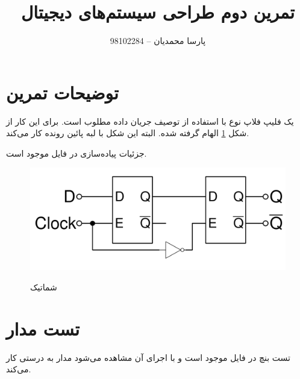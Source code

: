 \documentclass{article}
\title{تمرین دوم طراحی سیستم‌های دیجیتال}
\author{پارسا محمدیان -- 98102284}
\begin{document}
\maketitle
\newpage

\section{توضیحات تمرین}
یک فلیپ فلاپ نوع  
با استفاده از توصیف جریان داده مطلوب است. برای این کار از شکل 
\ref{dff-schematic} 
الهام گرفته شده.  البته این شکل با لبه پائین رونده کار می‌کند.

جزئیات پیاده‌سازی در فایل 
موجود است.

\begin{figure}[!htbp]
    \centering
    \includegraphics[width=\linewidth]{./fTPjE.png}
    \label{dff-schematic}
    \caption{شماتیک }
\end{figure}

\section{تست مدار}
تست بنچ در فایل 
موجود است و با اجرای آن مشاهده می‌شود مدار به درستی کار می‌کند.
\end{document}
